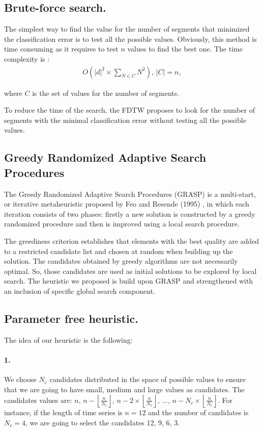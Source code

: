 \subsection{Brute-force search.}

The simplest way to find the value for the number of segments that minimized the
classification error is to test all the possible values.  Obviously, this
method is time consuming as it requires to test $n$ values to find the best one. The time complexity is :
\begin{eqnarray}
O(|d|^{2} \times \underset{N\in C}{\sum}{\displaystyle
N^{2}}),\, |C|=n,
\end{eqnarray}

where $C$ is the set of values for the number of segments.

To reduce the time of the search, the FDTW proposes to look for the
number of segments with the minimal classification error without testing all the possible values.

\subsection{ Greedy Randomized Adaptive Search Procedures}
The Greedy Randomized Adaptive Search Procedures (GRASP) is a multi-start, or iterative metaheuristic proposed by Feo and Resende
(1995) \cite{feo1995greedy}, in which each iteration consists of two phases:
firstly a new solution is constructed by a greedy randomized
procedure and  then is improved using a local search procedure.


The greediness criterion establishes that elements with the best quality are
 added to a restricted candidate list and chosen at random when
building up the solution. The candidates obtained by greedy algorithms are not
necessarily optimal. So, those candidates are  used as initial solutions
to be explored by local search. The heuristic  we proposed is build upon
GRASP and strengthened with an inclusion of specific global search component.




\subsection{Parameter free heuristic.}
The idea of our heuristic is the following:
\paragraph{1.} We choose $N_{c}$ candidates distributed in the space of possible values
to ensure that we are going to have small, medium and large values as
candidates. The candidates values are: $n,\,n-\left\lfloor
\frac{n}{N_{c}}\right\rfloor ,\,n-2\times\left\lfloor \frac{n}{N_{c}}\right\rfloor
,\,...,\,n-N_{c}\times\left\lfloor \frac{n}{N_{c}}\right\rfloor $. For instance, if the length of
time series is $n = 12$ and the number of candidates is $N_c = 4$, we are going to select the
candidates 12, 9, 6, 3.


